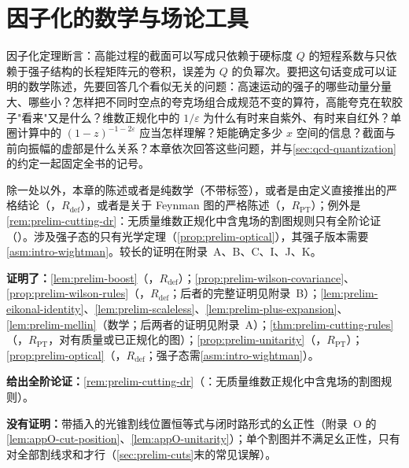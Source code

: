 \chapter{因子化的数学与场论工具}\label{ch:prelim}

因子化定理断言：高能过程的截面可以写成只依赖于硬标度 $Q$ 的短程系数与只依赖于强子结构的长程矩阵元的卷积，误差为 $Q$ 的负幂次。要把这句话变成可以证明的数学陈述，先要回答几个看似无关的问题：高速运动的强子的哪些动量分量大、哪些小？怎样把不同时空点的夸克场组合成规范不变的算符，高能夸克在软胶子"看来"又是什么？维数正规化中的 $1/\varepsilon$ 为什么有时来自紫外、有时来自红外？单圈计算中的 $(1-z)^{-1-2\varepsilon}$ 应当怎样理解？矩能确定多少 $x$ 空间的信息？截面与前向振幅的虚部是什么关系？本章依次回答这些问题，并与\cref{sec:qcd-quantization}的约定一起固定全书的记号。

除一处以外，本章的陈述或者是纯数学（不带标签），或者是由定义直接推出的严格结论（\tagR，$R_{\mathrm{def}}$），或者是关于 Feynman 图的严格陈述（\tagR，$R_{\mathrm{PT}}$）；例外是\cref{rem:prelim-cutting-dr}：无质量维数正规化中含鬼场的割图规则只有全阶论证（\tagA）。涉及强子态的只有光学定理（\cref{prop:prelim-optical}），其强子版本需要\cref{asm:intro-wightman}。较长的证明在附录~A、B、C、I、J、K。

\begin{tcolorbox}[enhanced,breakable,title=本章证明了什么／没有证明什么,fonttitle=\bfseries,
  colback=gray!3!white,colframe=gray!55!black,boxrule=0.6pt,arc=2pt,
  left=5pt,right=5pt,top=3pt,bottom=3pt,before skip=6pt,after skip=6pt]
\textbf{证明了：}\cref{lem:prelim-boost}（\tagR，$R_{\mathrm{def}}$）；\cref{prop:prelim-wilson-covariance}、\cref{prop:prelim-wilson-rules}（\tagR，$R_{\mathrm{def}}$；后者的完整证明见附录~B）；\cref{lem:prelim-eikonal-identity}、\cref{lem:prelim-scaleless}、\cref{lem:prelim-plus-expansion}、\cref{lem:prelim-mellin}（数学；后两者的证明见附录~A）；\cref{thm:prelim-cutting-rules}（\tagR，$R_{\mathrm{PT}}$，对有质量或已正规化的图）；\cref{prop:prelim-unitarity}（\tagR，$R_{\mathrm{PT}}$）；\cref{prop:prelim-optical}（\tagR，$R_{\mathrm{def}}$；强子态需\cref{asm:intro-wightman}）。\par
\textbf{给出全阶论证：}\cref{rem:prelim-cutting-dr}（\tagA：无质量维数正规化中含鬼场的割图规则）。\par
\textbf{没有证明：}带插入的光锥割线位置恒等式与闭时路形式的幺正性（附录~O 的\cref{lem:appO-cut-position}、\cref{lem:appO-unitarity}）；单个割图并不满足幺正性，只有对全部割线求和才行（\cref{sec:prelim-cuts}末的常见误解）。
\end{tcolorbox}

